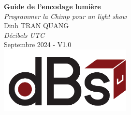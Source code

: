 \documentclass[a4paper,12pt]{report}
\begin{document}
\begin{titlepage}
    \centering
    \vspace*{2cm} %
    
    {\Huge\textbf{Guide de l'encodage lumière}}\\[1.5cm]
    
    {\Large\textit{Programmer la Chimp pour un light show}}\\[2cm]
    
    {\Large Dinh TRAN QUANG}\\[0.5cm]
    
    {\large\textit{Décibels UTC}}\\[3cm]
    
    {\large Septembre 2024 - V1.0}\\[3cm]
    
    \includegraphics[width=0.5\textwidth]{Logos/logo_decibels.png}
    
    \vfill %
\end{titlepage}

\renewcommand{\contentsname}{Sommaire} %
\newpage
\tableofcontents
\newpage






\end{document}

